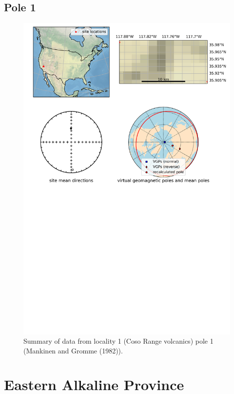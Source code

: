 \subsection{Pole 1}


\begin{figure}[H]
\centering
\includegraphics[width=5 in]{./1/1/pole_summary.png}
\caption{Summary of data from locality 1 (Coso Range volcanics) pole 1 (Mankinen and Gromme (1982)).}
\end{figure}

\section{Eastern Alkaline Province}
